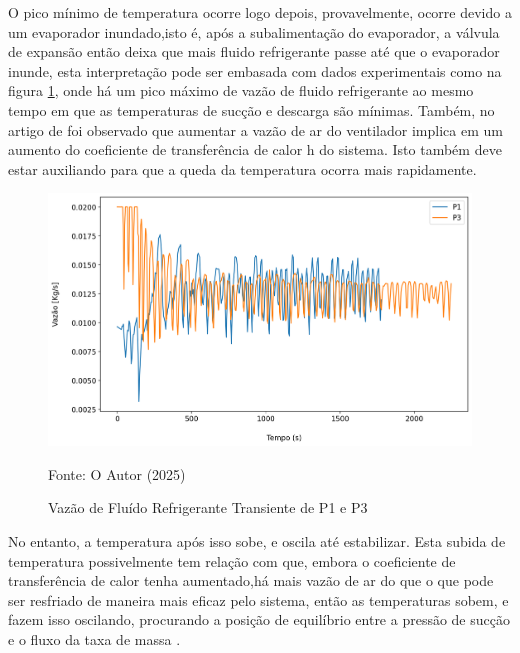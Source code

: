 O pico mínimo de temperatura ocorre logo depois, provavelmente, ocorre devido a um evaporador inundado,isto é, após a subalimentação do evaporador, a válvula de expansão então deixa que mais fluido refrigerante passe até que o evaporador inunde, esta interpretação pode ser embasada com dados experimentais como na figura \ref{fig:VazãodeFluidoPerturbaçãoVentilador}, onde há um pico máximo de vazão de fluido refrigerante ao mesmo tempo em que as temperaturas de sucção e descarga são mínimas. Também, no artigo de \textcite{VaryingFanSpeedCavallaro} foi observado que aumentar a vazão de ar do ventilador implica em um aumento do coeficiente de transferência de calor h do sistema. Isto também deve estar auxiliando para que a queda da temperatura ocorra mais rapidamente.
\newpage
\begin{figure}[h]
    \centering
    \includegraphics[width=1\linewidth]{FigurasdoTexto/VazãodeFluidoPerturbaçãoVentilador.png}
    \caption{Vazão de Fluído Refrigerante Transiente de P1 e P3}
    \label{fig:VazãodeFluidoPerturbaçãoVentilador}
    {\footnotesize Fonte: O Autor (2025)}
\end{figure}

No entanto, a temperatura após isso sobe, e oscila até estabilizar. Esta subida de temperatura possivelmente tem relação com que, embora o coeficiente de transferência de calor tenha aumentado,há mais vazão de ar do que o que pode ser resfriado de maneira mais eficaz pelo sistema, então as temperaturas sobem, e fazem isso oscilando, procurando a posição de equilíbrio entre a pressão de sucção e o fluxo da taxa de massa \cite{StoekerRefrigeration}.  


